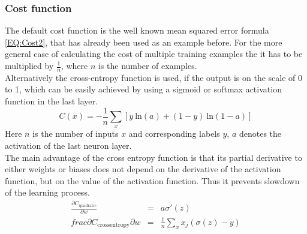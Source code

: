 		\subsubsection{Cost function}
			The default cost function is the well known mean squared error formula \ref{EQ:Cost2}, that has already been used as an example before. For the more general case of calculating the cost of multiple training examples the it has to be multiplied by $\frac{1}{n}$, where $n$ is the number of examples.\\
			Alternatively the cross-entropy function is used, if the output is on the scale of 0 to 1, which can be easily achieved by using a sigmoid or softmax activation function in the last layer.
			\begin{equation}
				C(x) = -\frac{1}{n} \sum_{x} \left[ y \: \mathrm{ln}(a) + (1-y) \: \mathrm{ln}(1-a) \right]
				\label{EQ:CostCrossEntropy}
			\end{equation}
			Here $n$ is the number of inputs $x$ and corresponding labels $y$, $a$ denotes the activation of the last neuron layer.\\
			The main advantage of the cross entropy function is that its partial derivative to either weights or biases does not depend on the derivative of the activation function, but on the value of the activation function. Thus it prevents slowdown of the learning process.
			\begin{eqnarray}
				\frac{\partial C_{\mathrm{quadratic}}}{\partial w} & = & a \sigma'(z)\\
				frac{\partial C_{\mathrm{cross entropy}}}{\partial w} & = & \frac{1}{n} \sum_{x} x_j (\sigma(z)-y) 
			\end{eqnarray}

